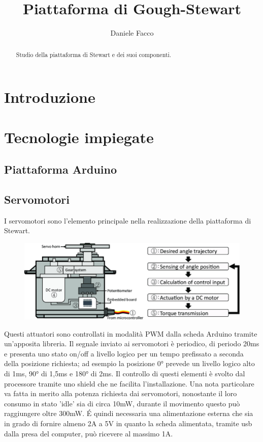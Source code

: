 \documentclass[11pt]{article}
\title{Piattaforma di Gough-Stewart}
\author{Daniele Facco}
\date{}
\begin{document}
\maketitle
\tableofcontents
\newpage

\begin{abstract}
Studio della piattaforma di Stewart e dei suoi componenti.
\end{abstract}

\section{Introduzione}\label{intro}


\section{Tecnologie impiegate}\label{tecnologie}

\subsection{Piattaforma Arduino}\label{arduino}


\subsection{Servomotori}\label{servomotori}
I servomotori sono l'elemento principale nella realizzazione della piattaforma di Stewart.

\begin{figure}[h!]
\centering
\includegraphics[scale=0.3]{Schematic-of-an-RC-servo-motor.png}
\end{figure}

Questi attuatori sono controllati in modalità PWM dalla scheda Arduino tramite un'apposita libreria. Il segnale inviato ai servomotori è periodico, di periodo 20ms e presenta uno stato on/off a livello logico per un tempo prefissato a seconda della posizione richiesta; ad esempio la posizione 0° prevede un livello logico alto di 1ms, 90° di 1,5ms e 180° di 2ms. Il controllo di questi elementi è svolto dal processore tramite uno shield che ne facilita l'installazione. Una nota particolare va fatta in merito alla potenza richiesta dai servomotori, nonostante il loro consumo in stato 'idle' sia di circa 10mW, durante il movimento questo può raggiungere oltre 300mW. É quindi necessaria una alimentazione esterna che sia in grado di fornire almeno 2A a 5V in quanto la scheda alimentata, tramite usb dalla presa del computer, può ricevere al massimo 1A.
\end{document}
